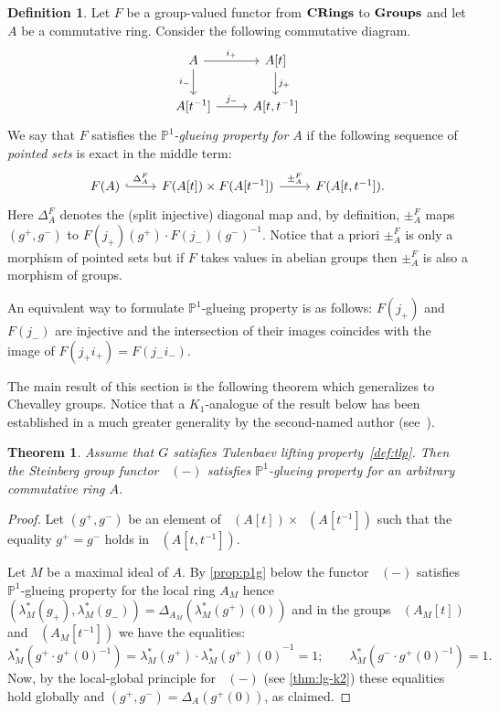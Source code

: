 \documentclass[oneside,12pt]{amsart}
\newtheorem{thm}{Theorem}
\numberwithin{equation}{section}
\numberwithin{lem}{section}
\theoremstyle{definition}
\newtheorem{dfn}[lem]{Definition}
\theoremstyle{remark}
\DeclareMathOperator{\St}{St^G}
\newcommand{\catname}[1]{{\normalfont\textbf{#1}}}
\newcommand{\Pro}{\mathbb{P}}
\begin{document}
\begin{dfn} \label{def:p1g} Let $F$ be a group-valued functor from $\catname{CRings}$ to $\catname{Groups}$ and let $A$ be a commutative ring.
Consider the following commutative diagram.
\[ \begin{tikzcd} A \ar[r, "i_+"] \ar[d, "i_-"'] & A[t] \ar[d, "j_+"] \\ A[t^{-1}] \ar[r, "j_-"] & A[t, t^{-1}] \end{tikzcd} \]
We say that $F$ satisfies the \emph{$\Pro^1$-glueing property for $A$} if the following sequence of \emph{pointed sets} is exact in the middle term:
\[ \begin{tikzcd} F(A) \ar[r, hookrightarrow, "\Delta_A^F"] & F(A[t]) \times F(A[t^{-1}]) \ar[r, "\pm_A^F"] & F(A[t, t^{-1}]). \end{tikzcd} \]
Here $\Delta^F_A$ denotes the (split injective) diagonal map and, by definition, $\pm_A^F$ maps $(g^+, g^-)$ to $F(j_+)(g^+) \cdot F(j_-)(g^-)^{-1}.$
Notice that a priori $\pm_A^F$ is only a morphism of pointed sets but if $F$ takes values in abelian groups then $\pm_A^F$ is also a morphism of groups. 

An equivalent way to formulate $\Pro^1$-glueing property is as follows: 
$F(j_+)$ and $F(j_-)$ are injective and the intersection of their images coincides with the image of $F(j_+ i_+) = F(j_- i_-).$ \end{dfn}

The main result of this section is the following theorem which generalizes \cite[Theorem~5.1]{Tu} to Chevalley groups.
Notice that a $K_1$-analogue of the result below has been established in a much greater generality by the second-named author (see~\cite[Theorem~1.1]{St-poly}).
\begin{thm} \label{thm:p1} Assume that $G$ satisfies Tulenbaev lifting property~\ref{def:tlp}.
Then the Steinberg group functor $\St(-)$ satisfies $\Pro^1$-glueing property for an arbitrary commutative ring $A$. \end{thm}
\begin{proof}
 Let $(g^+, g^-)$ be an element of $\St(A[t]) \times \St(A[t^{-1}])$ such that the equality $g^+ = g^-$ holds in $\St(A[t, t^{-1}])$.
 
 Let $M$ be a maximal ideal of $A$.
 By \cref{prop:p1g} below the functor $\St(-)$ satisfies $\Pro^1$-glueing property for the local ring $A_M$ hence 
 $(\lambda_M^*(g_+), \lambda_M^*(g_-)) = \Delta_{A_M}(\lambda_M^*(g^+)(0))$ and in the groups $\St(A_M[t])$ and $\St(A_M[t^{-1}])$ we have the equalities:
 $$\lambda_M^*(g^+ \cdot g^+(0)^{-1}) = \lambda_M^*(g^+) \cdot {\lambda_M^*(g^+)(0)}^{-1} = 1; \qquad \lambda_M^*(g^-\cdot g^+(0)^{-1}) =1. $$
 Now, by the local-global principle for $\St(-)$ (see \cref{thm:lg-k2}) these equalities hold globally and $(g^+, g^-) = \Delta_A(g^+(0))$, as claimed. 
\end{proof}
\end{document}
